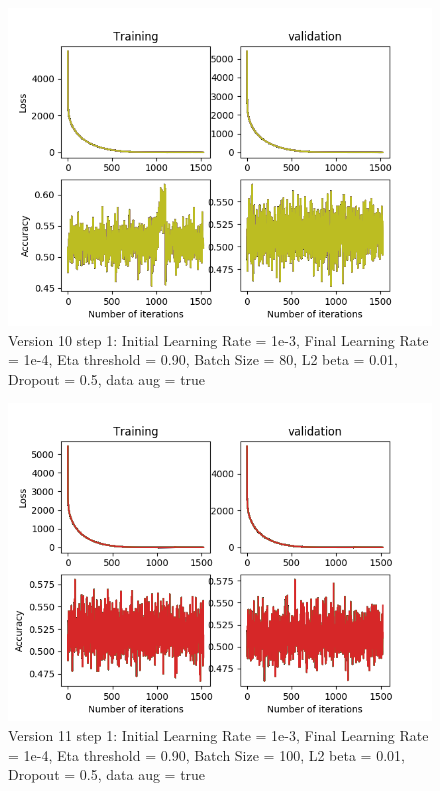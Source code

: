 \documentclass[12pt,reqno]{amsart}
\numberwithin{equation}{section}
\begin{document}
\begin{enumerate}
\begin{figure}[H]
\centering
\includegraphics[scale=0.6]{data_liquid155_version10_step1}
\caption{Version 10 step 1: Initial Learning Rate = 1e-3, Final Learning Rate = 1e-4, Eta threshold = 0.90, Batch Size = 80, L2 beta = 0.01, Dropout = 0.5, data aug = true}
\end{figure}

\begin{figure}[H]
\centering
\includegraphics[scale=0.6]{data_liquid155_version11_step1}
\caption{Version 11 step 1: Initial Learning Rate = 1e-3, Final Learning Rate = 1e-4, Eta threshold = 0.90, Batch Size = 100, L2 beta = 0.01, Dropout = 0.5, data aug = true}
\end{figure}


\end{enumerate}
\end{document}
